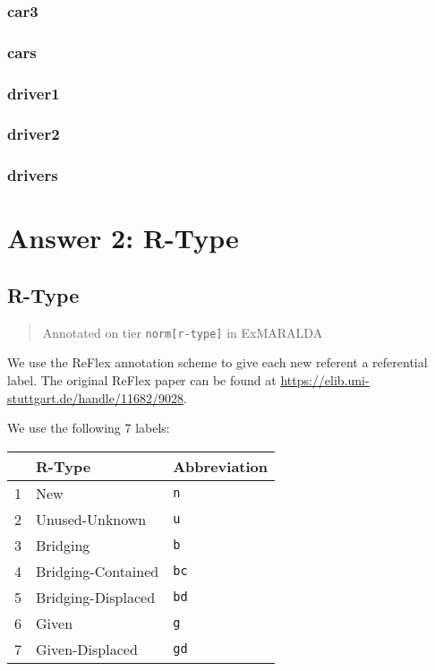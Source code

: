 \documentclass[
]{book}
\begin{document}
\hypertarget{car3}{%
\subsection{car3}\label{car3}}

\hypertarget{cars}{%
\subsection{cars}\label{cars}}

\hypertarget{driver1}{%
\subsection{driver1}\label{driver1}}

\hypertarget{driver2}{%
\subsection{driver2}\label{driver2}}

\hypertarget{drivers}{%
\subsection{drivers}\label{drivers}}

\hypertarget{answer-2-r-type}{%
\chapter{Answer 2: R-Type}\label{answer-2-r-type}}

\hypertarget{r-type}{%
\section{R-Type}\label{r-type}}

\begin{quote}
Annotated on tier \texttt{norm{[}r-type{]}} in ExMARALDA
\end{quote}

We use the ReFlex annotation scheme to give each new referent a referential label.
The original ReFlex paper can be found at \url{https://elib.uni-stuttgart.de/handle/11682/9028}.

We use the following 7 labels:

\begin{longtable}[]{@{}lll@{}}
\toprule
& R-Type & Abbreviation\tabularnewline
\midrule
\endhead
1 & New & \texttt{n}\tabularnewline
2 & Unused-Unknown & \texttt{u}\tabularnewline
3 & Bridging & \texttt{b}\tabularnewline
4 & Bridging-Contained & \texttt{bc}\tabularnewline
5 & Bridging-Displaced & \texttt{bd}\tabularnewline
6 & Given & \texttt{g}\tabularnewline
7 & Given-Displaced & \texttt{gd}\tabularnewline
\bottomrule
\end{longtable}
\end{document}
